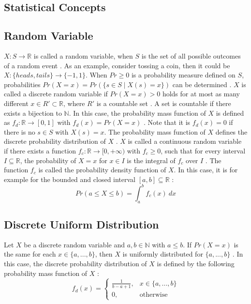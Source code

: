\subsection{Statistical Concepts}
\subsection*{Random Variable}
$X: S \rightarrow \mathbb{R}$ is called a random variable, when $S$ is the set of all possible outcomes of a random event \cite{Standardization}. As an example, consider tossing a coin, then it could be $X: \{heads,tails\} \rightarrow \{-1,1\}$. When $Pr \geq 0$ is a probability measure defined on $S$, probabilities $Pr(X = x) = Pr(\{s \in S \mid X(s) = x\})$ can be determined \cite{Standardization}. \newline
$X$ is called a discrete random variable if $Pr(X = x) > 0$ holds for at most as many different $x \in R' \subset \mathbb{R}$, where $R'$ is a countable set \cite{Standardization}. A set is countable if there exists a bijection to $\mathbb{N}$. In this case, the probability mass function of $X$ is defined as $f_d: \mathbb{R} \rightarrow [0,1]$ with $f_d(x) = Pr(X = x)$ \cite{Standardization}. Note that it is $f_d(x) = 0$ if there is no $s \in S$ with $X(s) = x$. The probability mass function of $X$ defines the discrete probability distribution of $X$ \cite{Standardization}. \newline
$X$ is called a continuous random variable if there exists a function $f_c: \mathbb{R} \rightarrow [0,+\infty)$ with $f_c \geq 0$, such that for every interval $I \subseteq \mathbb{R}$, the probability of $X = x$ for $x \in I$ is the integral of $f_c$ over $I$ \cite{Standardization}. The function $f_c$ is called the probability density function of $X$. In this case, it is for example for the bounded and closed interval $[a,b] \subseteq \mathbb{R}$ \cite{Standardization}:
\begin{equation}
Pr(a \leq X \leq b) = \int_{a}^{b} f_c(x) \ dx
\label{eq:continuous_random_var}
\end{equation}
\subsection*{Discrete Uniform Distribution}
Let $X$ be a discrete random variable and $a,b \in \mathbb{N}$ with $a \leq b$. If $Pr(X = x)$ is the same for each $x \in \{a, ..., b\}$, then $X$ is uniformly distributed for $\{a, ..., b\}$ \cite{Standardization}. In this case, the discrete probability distribution of $X$ is defined by the following probability mass function of $X$ \cite{Standardization}:
\begin{equation}
f_d(x) =
\begin{cases}
\frac{1}{b - a + 1}, & x \in \{a, ..., b\} \\
0, & \text{otherwise}
\end{cases}
\label{eq:uniform_distribution}
\end{equation}
